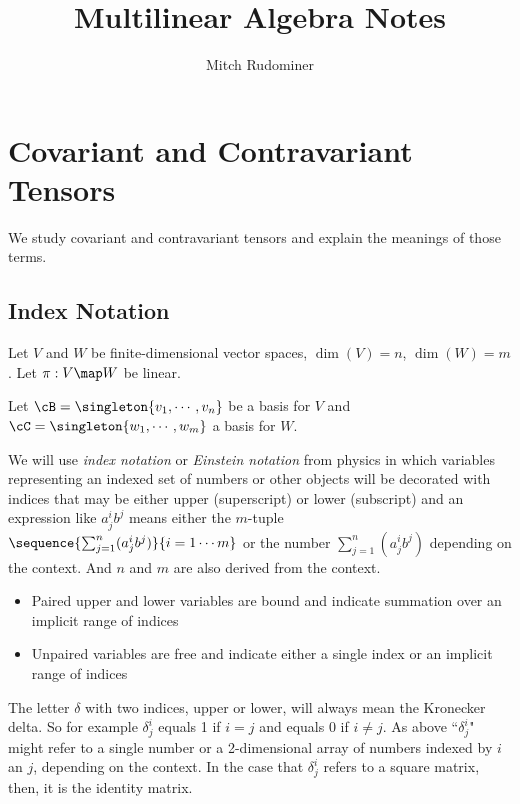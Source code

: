 \documentclass[oneside,12pt]{amsart}
\begin{document}
\title{Multilinear Algebra Notes}
\author{Mitch Rudominer}

\maketitle

\tableofcontents


\section{Covariant and Contravariant Tensors}

We study covariant and contravariant tensors and explain the meanings of those terms.

\subsection{Index Notation}

Let $V$ and $W$ be finite-dimensional vector spaces, 
$\dim(V)=n$, $\dim(W) = m$. Let $\pi:V\map W$ be linear.

Let $\cB = \singleton{v_1,\cdots,v_n}$ be a basis for $V$ and
$\cC=\singleton{w_1,\cdots,w_m}$ a basis for $W$.

We will use \emph{index notation} or \emph{Einstein notation}
from physics in which variables representing an indexed set of numbers or other objects will
be decorated with indices that may be either upper (superscript) or lower (subscript) and
an expression
like $a^i_j b^j$ means either the $m$-tuple 
$\sequence{\sum_{j=1}^n(a^i_j b^j)}{i=1\cdots m}$
or the number $\sum_{j=1}^n(a^i_j b^j)$ depending on the context. 
And $n$ and $m$ are also derived from the context.

\begin{itemize}
\item Paired upper and lower variables are bound and indicate summation over an implicit range of indices
\item Unpaired variables are free and indicate either a single index or an implicit range of indices
\end{itemize}

The letter $\delta$ with two indices, upper or lower, will always mean the Kronecker delta. So for example $\delta^i_j$ equals 1 if $i=j$ and equals 0 if $i\neq j$. 
As above ``$\delta^i_j$" might refer to a single number or a 2-dimensional array
of numbers indexed by $i$ an $j$, depending on the context. In the case that
$\delta^i_j$ refers to a square matrix, then, it is the identity matrix.
\end{document}
